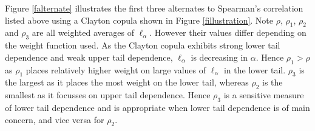 \documentclass[authoryear]{elsarticle}
\newcommand{\fref}[1]{Figure \ref{#1}}
\begin{document}
\begin{itemize}
\end{itemize}

\fref{falternate} illustrates the first three alternates to Spearman's correlation listed above using a Clayton copula shown in \fref{fillustration}. Note $\rho$, $\rho_1$, $\rho_2$ and $\rho_3$ are all weighted averages of $\ell_\alpha$. However their values differ depending on the weight function used. As the Clayton copula exhibits strong lower tail dependence and weak upper tail dependence, $\ell_\alpha$ is decreasing in $\alpha$. Hence $\rho_1>\rho$ as $\rho_1$ places relatively higher weight on large values of $\ell_\alpha$ in the lower tail. $\rho_3$ is the largest as it places the most weight on the lower tail, whereas $\rho_2$ is the smallest as it focusses on upper tail dependence. Hence $\rho_3$ is a sensitive measure of lower tail dependence and is appropriate when lower tail dependence is of main concern, and vice versa for $\rho_2$.
\end{document}
